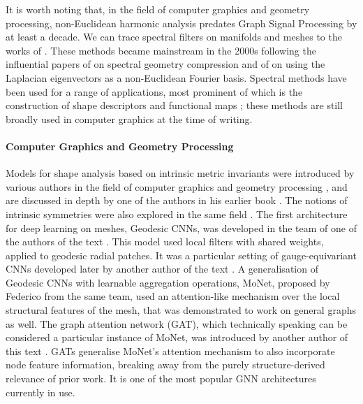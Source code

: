 It is worth noting that, in the field of computer graphics and geometry processing, non-Euclidean harmonic analysis predates Graph Signal Processing by at least a decade. We can trace spectral filters on manifolds and meshes to the works of \cite{taubin1996optimal}. These methods became mainstream in the 2000s following the influential papers of %
\cite{karni2000spectral} on spectral geometry compression and of \cite{levy2006laplace} on using the Laplacian eigenvectors as a non-Euclidean Fourier basis. 
%
Spectral methods have been used for a range of applications, most prominent of which is the construction of shape descriptors \citep{sun2009concise} and functional maps \citep{ovsjanikov2012functional}; these methods are still broadly used in computer graphics at the time of writing. 






\paragraph{Computer Graphics and Geometry Processing}
Models for shape analysis based on intrinsic metric invariants were introduced by various authors in the field of computer graphics and geometry processing \citep{elad2003bending,memoli2005theoretical,bronstein2006generalized}, and are discussed in depth by one of the authors in his earlier book \citep{bronstein2008numerical}. The notions of intrinsic symmetries were also explored in the same field  \cite{raviv2007symmetries,ovsjanikov2008global}. 
%
The first architecture for deep learning on meshes, Geodesic CNNs, was developed in the team of one of the authors of the text \citep{masci2015geodesic}. This model used local filters with shared weights, applied to geodesic radial patches. It was a particular setting of gauge-equivariant CNNs developed later by another author of the text \citep{cohen2019gauge}. 
%
A generalisation of Geodesic CNNs with learnable aggregation operations, MoNet, proposed by Federico  \cite{monti2017geometric} from the same team, used an attention-like mechanism over the local structural features of the mesh, that was demonstrated to work on general graphs as well. 
%
The graph attention network (GAT), which technically speaking can be considered a particular instance of MoNet, was introduced by another author of this text \citep{velickovic2018graph}. GATs generalise MoNet's attention mechanism to also incorporate node feature information, breaking away from the purely structure-derived relevance of prior work. It is one of the most popular GNN architectures currently in use.


